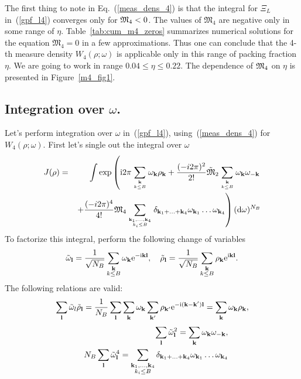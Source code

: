 The first thing to note in Eq.~(\ref{meas_dens_4}) is that the integral for $\Xi_L$ in~(\ref{gpf_l4}) converges only for $\frak M_4 < 0$. The values of $\mathfrak M_4$ are negative only in some range of $\eta$. Table~{\ref{tab:cum_m4_zeros}} summarizes numerical solutions for the equation $\mathfrak{M_4}=0$ in a few approximations. Thus one can conclude that the 4-th measure density $W_4(\rho; \omega)$ is applicable only in this range of packing fraction $\eta$. We are going to work in range $0.04 \le \eta \le 0.22$. The dependence of $\frak M_4$ on $\eta$ is presented in Figure~\ref{m4_fig1}.

\subsection{Integration over $\omega$.}
Let's perform integration over $\omega$ in~(\ref{gpf_l4}), using~(\ref{meas_dens_4}) for $W_4(\rho; \omega)$. First let's single out the integral over $\omega$
\begin{eqnarray}
	J(\rho) &=& \int \exp \left(
	{\rm i}2\pi \sum\limits_{{\vb k} \atop k\le B} \omega_{\vb k} \rho_{\vb k}
	+ \frac{(-i2\pi)^2}{2!}\tilde{\frak M}_2 \sum\limits_{{\vb k} \atop k\le B} \omega_{\vb k} \omega_{-\vb k}
	\right.
	\nonumber\\
	&& \left. +
	\frac{(-i2\pi)^4}{4!} 
	{\frak M}_4
	\sum\limits_{\vb{k}_1,\dotsc,\vb{k}_4\atop{k_i \le B}}
	\delta_{\vb{k}_1 + \dotsc + \vb{k}_4} 
	\omega_{{\vb k}_1} \dots \omega_{{\vb k}_4} \right) ({\rm d} \omega)^{N_B}
\end{eqnarray}
To factorize this integral, perform the following change of variables
\begin{equation}
	\tilde{\omega}_{\vb l} = \frac{1}{\sqrt{N_B}}\sum_{\substack{\vb k \\ k \leq B}} \omega_{\vb k} {\rm e}^{-{\rm i}\vb k \vb l}
	, \quad \tilde{\rho}_{\vb l} = \frac{1}{\sqrt{N_B}} \sum_{\substack{\vb k \\ k \leq B}} \rho_{\vb k} {\rm e}^{{\rm i}\vb k \vb l}.
\end{equation}
The following relations are valid:
\begin{equation}
	\sum_{\vb l} \tilde{\omega}_{l} \tilde{\rho}_{\vb l} = \frac{1}{N_B} \sum_{\vb l} \sum_{\vb k} \omega_{\vb k} \sum_{\vb k'} \rho_{\vb k'} {\rm e}^{-{\rm i} (\vb k - \vb k') \vb l} = \sum_{\vb k} \omega_{\vb k} \rho_{\vb k},
\end{equation}
\begin{eqnarray}
	&&\sum_{\vb l}\tilde{\omega}_{\vb l}^2 = \sum_{\vb k}\omega_{\vb k} \omega_{-\vb k},
	\\
	&&N_B \sum_{\vb l}\tilde{\omega}_{\vb l}^4 = \sum\limits_{\substack{\vb{k}_1,\dotsc,\vb{k}_4 \\ {k_i \le B}}}
	\delta_{\vb{k}_1 + \dotsc + \vb{k}_4} 
	\omega_{{\vb k}_1} \dots \omega_{{\vb k}_4}
\end{eqnarray}
